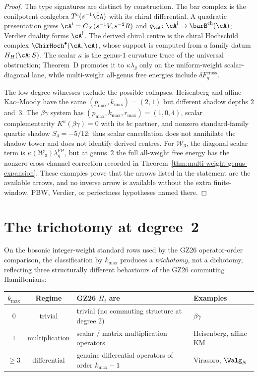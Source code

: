 \begin{proof}
The type signatures are distinct by construction. The bar complex is
the conilpotent coalgebra $T^c(s^{-1}\bar\cA)$ with its chiral
differential.  A quadratic presentation gives
$\cA^{\mathrm i}=C_X(s^{-1}V,s^{-2}R)$ and
$q_\cA\colon\cA^{\mathrm i}\to\barB^{\mathrm{ch}}(\cA)$; Verdier
duality forms $\cA^!$.  The derived chiral centre is the chiral
Hochschild complex
$\ChirHoch^\bullet(\cA,\cA)$, whose support is computed from a family
datum $H_H(\cA;S)$. The scalar $\kappa$ is the genus-$1$ curvature trace of
the universal obstruction; Theorem~D promotes it to
$\kappa\lambda_g$ only on the uniform-weight scalar-diagonal lane,
while multi-weight all-genus free energies include
$\delta F_g^{\mathrm{cross}}$.

The low-degree witnesses exclude the possible collapses. Heisenberg
and affine Kac--Moody have the same
$(p_{\max},k_{\max})=(2,1)$ but different shadow depths
$2$ and~$3$. The $\beta\gamma$ system has
$(p_{\max},k_{\max},r_{\max})=(1,0,4)$, scalar complementarity
$K^\kappa(\beta\gamma)=0$ with its $bc$ partner, and nonzero
standard-family quartic shadow $S_4=-5/12$; thus scalar cancellation
does not annihilate the shadow tower and does not identify derived
centres. For $\mathcal W_3$, the diagonal scalar term is
$\kappa(\mathcal W_3)\lambda_g^{\mathrm{FP}}$, but at genus~$2$ the
full all-weight free energy has the nonzero cross-channel correction
recorded in Theorem~\ref{thm:multi-weight-genus-expansion}. These
examples prove that the arrows listed in the statement are the
available arrows, and no inverse arrow is available without the extra
finite-window, PBW, Verdier, or perfectness hypotheses named there.
\end{proof}

\section{The trichotomy at degree~2}
\label{sec:three-invariants-trichotomy}

On the bosonic integer-weight standard rows used by the GZ\textup{26}
operator-order comparison, the classification by $k_{\max}$ produces a
\emph{trichotomy}, not a dichotomy, reflecting three structurally
different behaviours of the GZ\textup{26} commuting Hamiltonians:

\begin{center}
\renewcommand{\arraystretch}{1.3}
\begin{tabular}{ccll}
$k_{\max}$ & \textbf{Regime} & \textbf{GZ\textup{26} $H_i$ are} & \textbf{Examples} \\
\hline
$0$ & trivial & trivial (no commuting structure at degree 2) & $\beta\gamma$ \\
$1$ & multiplication & scalar / matrix multiplication operators
 & Heisenberg, affine KM \\
$\geq 3$ & differential & genuine differential operators of order $k_{\max}-1$
 & Virasoro, $\Walg_N$ \\
\end{tabular}
\end{center}

